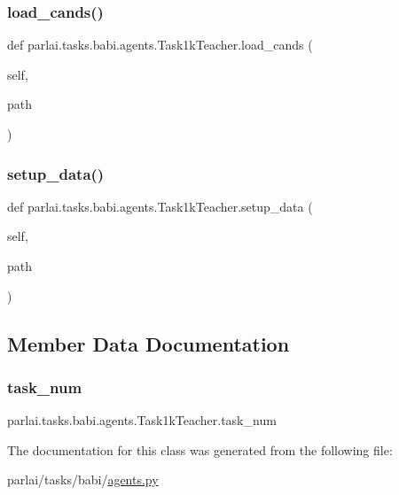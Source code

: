 \subsubsection{\texorpdfstring{load\+\_\+cands()}{load\_cands()}}
{\footnotesize\ttfamily def parlai.\+tasks.\+babi.\+agents.\+Task1k\+Teacher.\+load\+\_\+cands (\begin{DoxyParamCaption}\item[{}]{self,  }\item[{}]{path }\end{DoxyParamCaption})}

\mbox{\label{classparlai_1_1tasks_1_1babi_1_1agents_1_1Task1kTeacher_a191f80b829fd3103238317eed2cad03e}} 
\subsubsection{\texorpdfstring{setup\+\_\+data()}{setup\_data()}}
{\footnotesize\ttfamily def parlai.\+tasks.\+babi.\+agents.\+Task1k\+Teacher.\+setup\+\_\+data (\begin{DoxyParamCaption}\item[{}]{self,  }\item[{}]{path }\end{DoxyParamCaption})}



\subsection{Member Data Documentation}
\mbox{\label{classparlai_1_1tasks_1_1babi_1_1agents_1_1Task1kTeacher_a0c153d5823837de445669016a18540e7}} 
\subsubsection{\texorpdfstring{task\+\_\+num}{task\_num}}
{\footnotesize\ttfamily parlai.\+tasks.\+babi.\+agents.\+Task1k\+Teacher.\+task\+\_\+num}



The documentation for this class was generated from the following file\+:\begin{DoxyCompactItemize}
\item 
parlai/tasks/babi/\hyperlink{parlai_2tasks_2babi_2agents_8py}{agents.\+py}\end{DoxyCompactItemize}
